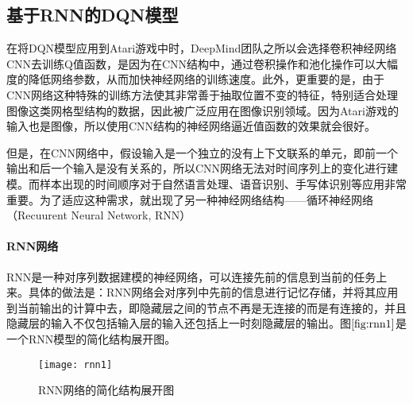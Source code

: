
\subsection{基于RNN的DQN模型}
在将DQN模型应用到Atari游戏中时\citep{mnih2013playing}，DeepMind团队之所以会选择卷积神经网络CNN去训练Q值函数，是因为在CNN结构中，通过卷积操作和池化操作可以大幅度的降低网络参数，从而加快神经网络的训练速度。此外，更重要的是，由于CNN网络这种特殊的训练方法使其非常善于抽取位置不变的特征，特别适合处理图像这类网格型结构的数据，因此被广泛应用在图像识别领域。因为Atari游戏的输入也是图像，所以使用CNN结构的神经网络逼近值函数的效果就会很好。

但是，在CNN网络中，假设输入是一个独立的没有上下文联系的单元，即前一个输出和后一个输入是没有关系的，所以CNN网络无法对时间序列上的变化进行建模。而样本出现的时间顺序对于自然语言处理、语音识别、手写体识别等应用非常重要。为了适应这种需求，就出现了另一种神经网络结构——循环神经网络（Recuurent Neural Network, RNN）

 \paragraph{RNN网络}
RNN是一种对序列数据建模的神经网络，可以连接先前的信息到当前的任务上来。具体的做法是：RNN网络会对序列中先前的信息进行记忆存储，并将其应用到当前输出的计算中去，即隐藏层之间的节点不再是无连接的而是有连接的，并且隐藏层的输入不仅包括输入层的输入还包括上一时刻隐藏层的输出。图$\ref{fig:rnn1}$是一个RNN模型的简化结构展开图。
\begin{figure}[htbp]
\centering
\texttt{[image: rnn1]}
\caption{RNN网络的简化结构展开图}
\label{fig:rnn1}
\end{figure}

